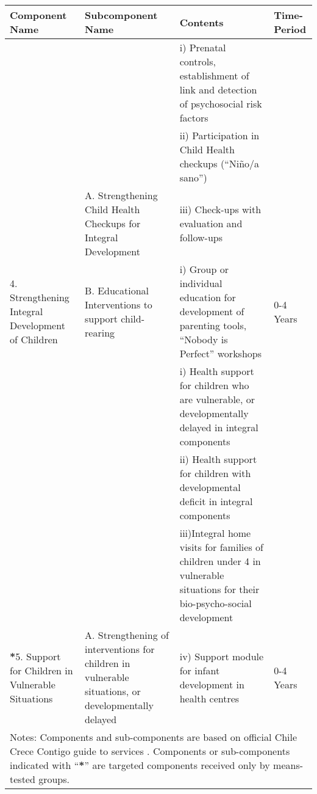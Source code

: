\documentclass[12pt]{article}
\begin{document}
\begin{spacing}{1.4}
\begin{landscape}
\begin{table}[htpb!]
  \begin{tabular}{p{4.5cm}p{5cm}p{10cm}p{2.5cm}}
    \toprule
    Component Name & Subcomponent Name & Contents & Time-Period\\ \midrule
&\cellcolor{dccol}&\cellcolor{dccol}i) Prenatal controls, establishment of link and detection of psychosocial risk factors  & \\
&   \cellcolor{dccol}         &ii) Participation in Child Health checkups (``Ni\~no/a sano'') & \\
&  \multirow{-3.8}{5cm}{\cellcolor{dccol}A. Strengthening Child Health Checkups for Integral Development} &\cellcolor{dccol}iii) Check-ups with evaluation and follow-ups & \\
    \multirow{-4}{4.5cm}{4. Strengthening Integral Development of Children} &B. Educational Interventions to support child-rearing&i) Group or individual education for development of parenting tools, ``Nobody is Perfect'' workshops&\multirow{-4}{2.5cm}{0-4 Years}\\ \midrule %
\cellcolor{dccol}&\cellcolor{dccol} &\cellcolor{dccol} i) Health support for children who are vulnerable, or developmentally delayed in integral components&\cellcolor{dccol} \\
\cellcolor{dccol}&\cellcolor{dccol}&ii) Health support for children with developmental deficit in integral components&\cellcolor{dccol}\\
\cellcolor{dccol}&\cellcolor{dccol}&\cellcolor{dccol} iii)Integral home visits for families of children under 4 in vulnerable situations for their bio-psycho-social development&\cellcolor{dccol}\\
\multirow{-6}{4.5cm}{\cellcolor{dccol}\textbf{*}5. Support for Children in Vulnerable Situations}&\multirow{-6}{5cm}{\cellcolor{dccol}A. Strengthening of interventions for children in vulnerable situations, or developmentally delayed}&iv) Support module for infant development in health centres &\multirow{-2}{2.5cm}{\cellcolor{dccol} 0-4 Years}\\ \midrule
\multicolumn{4}{p{22cm}}{Notes: Components and sub-components are based on official Chile Crece Contigo guide to services \citep{MDS2014}. Components or sub-components indicated with ``\textbf{*}'' are targeted components received only by means-tested groups.} \\
\bottomrule


\end{tabular}
\end{table}
\end{landscape}
\end{spacing}
\end{document}
